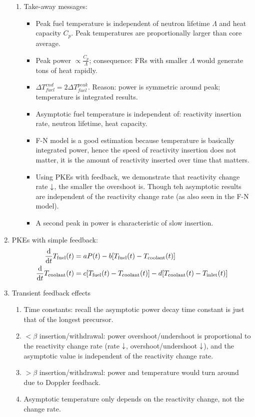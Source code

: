 \documentclass{school-22.211-notes}
\begin{document}
\begin{enumerate}
\begin{enumerate}
    \item Take-away messages:
      \begin{itemize}
      \item Peak fuel temperature is independent of neutron lifetime $\Lambda$ and heat capacity $C_p$. Peak temperatures are proportionally larger than core average. 
      \item Peak power $\propto \frac{C_p}{\Lambda}$; consequence: FRs with smaller $\Lambda$ would generate tons of heat rapidly. 
      \item $\Delta T_{fuel}^{end} = 2 \Delta T_{fuel}^{peak}$. Reason: power is symmetric around peak; temperature is integrated results. 
      \item Asymptotic fuel temperature is independent of: reactivity insertion rate, neutron lifetime, heat capacity. 
      \item F-N model is a good estimation because temperature is basically integrated power, hence the speed of reactivity insertion does not matter, it is the amount of reactivity inserted over time that matters. 
      \item Using PKEs with feedback, we demonstrate that reactivity change rate $\downarrow$, the smaller the overshoot is. Though teh asymptotic results are independent of the reactivity change rate (as also seen in the F-N model). 
      \item A second peak in power is characteristic of slow insertion. 
      \end{itemize}
  \end{enumerate}

\item PKEs with simple feedback: 
  \begin{align}
    \frac{\mathrm{d}}{\mathrm{d}t} T_{\mathrm{fuel}} (t) &= a P(t) - b [T_{\mathrm{fuel}}(t) - T_{\mathrm{coolant}}(t)] \\
    \frac{\mathrm{d}}{\mathrm{d}t} T_{\mathrm{coolant}} (t) &= c [T_{\mathrm{fuel}}(t) - T_{\mathrm{coolant}} (t) ] - d [T_{\mathrm{coolant}} (t) - T_{\mathrm{inlet}} (t) ] 
  \end{align}

\item Transient feedback effects
  \begin{enumerate}
  \item Time constants: recall the asymptotic power decay time constant is just that of the longest precursor. 
  \item $< \beta$ insertion/withdrawal: power overshoot/undershoot is proportional to the reactivity change rate (rate $\downarrow$, overshoot/undershoot $\downarrow$), and the asymptotic value is independent of the reactivity change rate. 
  \item $> \beta$ insertion/withdrawal: power and temperature would turn around due to Doppler feedback. 
  \item Asymptotic temperature only depends on the reactivity change, not the change rate. 
  \end{enumerate}


\end{enumerate}
\end{document}
